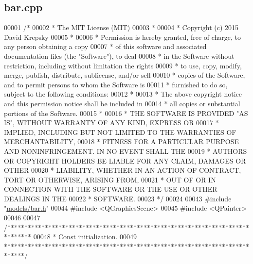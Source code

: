 \hypertarget{bar_8cpp_source}{}\subsection{bar.\+cpp}
\label{bar_8cpp_source}

\begin{DoxyCode}
00001 \textcolor{comment}{/*}
00002 \textcolor{comment}{ * The MIT License (MIT)}
00003 \textcolor{comment}{ *}
00004 \textcolor{comment}{ * Copyright (c) 2015 David Krepsky}
00005 \textcolor{comment}{ *}
00006 \textcolor{comment}{ * Permission is hereby granted, free of charge, to any person obtaining a copy}
00007 \textcolor{comment}{ * of this software and associated documentation files (the "Software"), to deal}
00008 \textcolor{comment}{ * in the Software without restriction, including without limitation the rights}
00009 \textcolor{comment}{ * to use, copy, modify, merge, publish, distribute, sublicense, and/or sell}
00010 \textcolor{comment}{ * copies of the Software, and to permit persons to whom the Software is}
00011 \textcolor{comment}{ * furnished to do so, subject to the following conditions:}
00012 \textcolor{comment}{ *}
00013 \textcolor{comment}{ * The above copyright notice and this permission notice shall be included in}
00014 \textcolor{comment}{ * all copies or substantial portions of the Software.}
00015 \textcolor{comment}{ *}
00016 \textcolor{comment}{ * THE SOFTWARE IS PROVIDED "AS IS", WITHOUT WARRANTY OF ANY KIND, EXPRESS OR}
00017 \textcolor{comment}{ * IMPLIED, INCLUDING BUT NOT LIMITED TO THE WARRANTIES OF MERCHANTABILITY,}
00018 \textcolor{comment}{ * FITNESS FOR A PARTICULAR PURPOSE AND NONINFRINGEMENT. IN NO EVENT SHALL THE}
00019 \textcolor{comment}{ * AUTHORS OR COPYRIGHT HOLDERS BE LIABLE FOR ANY CLAIM, DAMAGES OR OTHER}
00020 \textcolor{comment}{ * LIABILITY, WHETHER IN AN ACTION OF CONTRACT, TORT OR OTHERWISE, ARISING FROM,}
00021 \textcolor{comment}{ * OUT OF OR IN CONNECTION WITH THE SOFTWARE OR THE USE OR OTHER DEALINGS IN THE}
00022 \textcolor{comment}{ * SOFTWARE.}
00023 \textcolor{comment}{ */}
00024 
00043 \textcolor{preprocessor}{#include "\hyperlink{bar_8h}{models/bar.h}"}
00044 \textcolor{preprocessor}{#include <QGraphicsScene>}
00045 \textcolor{preprocessor}{#include <QPainter>}
00046 
00047 \textcolor{comment}{/*******************************************************************************}
00048 \textcolor{comment}{ * Const initialization.}
00049 \textcolor{comment}{ ******************************************************************************/}

\end{DoxyCode}

